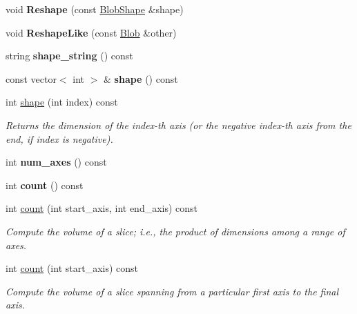 \begin{DoxyCompactItemize}
\mbox{\label{classcaffe_1_1_blob_a787ff5e31db6b53b70fb117002ec0385}} 
void {\bfseries Reshape} (const \mbox{\hyperlink{classcaffe_1_1_blob_shape}{Blob\+Shape}} \&shape)
\item 
\mbox{\label{classcaffe_1_1_blob_aa8dee739aaa4253f73c44904784ce417}} 
void {\bfseries Reshape\+Like} (const \mbox{\hyperlink{classcaffe_1_1_blob}{Blob}} \&other)
\item 
\mbox{\label{classcaffe_1_1_blob_a868a4da9a750d6db6c25b40987fbfdc4}} 
string {\bfseries shape\+\_\+string} () const
\item 
\mbox{\label{classcaffe_1_1_blob_a95f030e56059c5bda665ef0fa88a69df}} 
const vector$<$ int $>$ \& {\bfseries shape} () const
\item 
int \mbox{\hyperlink{classcaffe_1_1_blob_a807f4da98e8e0d1f60badb1f540fe010}{shape}} (int index) const
\begin{DoxyCompactList}\small\item\em Returns the dimension of the index-\/th axis (or the negative index-\/th axis from the end, if index is negative). \end{DoxyCompactList}\item 
\mbox{\label{classcaffe_1_1_blob_aa2528ae4670a99e187366bbbbc51a8b2}} 
int {\bfseries num\+\_\+axes} () const
\item 
\mbox{\label{classcaffe_1_1_blob_a6f8486dd22d1babd617651e6c328acec}} 
int {\bfseries count} () const
\item 
int \mbox{\hyperlink{classcaffe_1_1_blob_a8674686a97c961b309b4420ead6626b5}{count}} (int start\+\_\+axis, int end\+\_\+axis) const
\begin{DoxyCompactList}\small\item\em Compute the volume of a slice; i.\+e., the product of dimensions among a range of axes. \end{DoxyCompactList}\item 
int \mbox{\hyperlink{classcaffe_1_1_blob_aab573b2a70c26bf3b2ae65e42706003e}{count}} (int start\+\_\+axis) const
\begin{DoxyCompactList}\small\item\em Compute the volume of a slice spanning from a particular first axis to the final axis. \end{DoxyCompactList}\item 

\end{DoxyCompactItemize}
